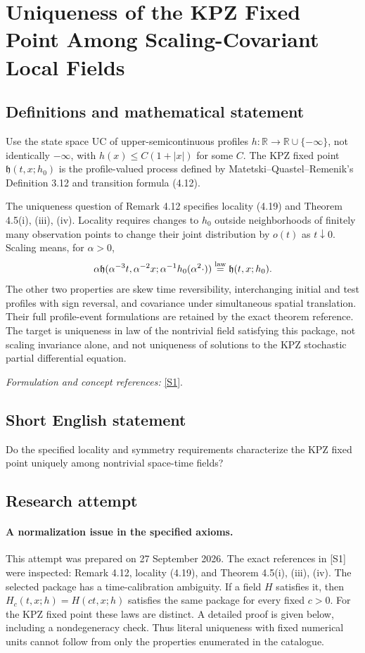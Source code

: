 \documentclass[11pt]{article}
\begin{document}
\section*{\texorpdfstring{Uniqueness of the KPZ Fixed Point Among Scaling-Covariant Local Fields}{Uniqueness of the KPZ Fixed Point Among Scaling-Covariant Local Fields}}\label{452}
\subsection{Definitions and mathematical statement}
Use the state space $\mathrm{UC}$ of upper-semicontinuous profiles $h:{\mathbb{R}}\to{\mathbb{R}}\cup\{-\infty\}$, not identically $-\infty$, with $h(x)\le C(1+|x|)$ for some $C$. The KPZ fixed point $\mathfrak h(t,x;h_0)$ is the profile-valued process defined by Matetski--Quastel--Remenik's Definition 3.12 and transition formula (4.12).

The uniqueness question of Remark 4.12 specifies locality (4.19) and Theorem 4.5(i), (iii), (iv). Locality requires changes to $h_0$ outside neighborhoods of finitely many observation points to change their joint distribution by $o(t)$ as $t\downarrow0$. Scaling means, for $\alpha>0$,
\[
 \alpha\mathfrak h(\alpha^{-3}t,\alpha^{-2}x;
       \alpha^{-1}h_0(\alpha^2\cdot))
 \overset{\rm law}=\mathfrak h(t,x;h_0).
\]
The other two properties are skew time reversibility, interchanging initial and test profiles with sign reversal, and covariance under simultaneous spatial translation. Their full profile-event formulations are retained by the exact theorem reference. The target is uniqueness in law of the nontrivial field satisfying this package, not scaling invariance alone, and not uniqueness of solutions to the KPZ stochastic partial differential equation.
\par\smallskip\textit{Formulation and concept references:} \href{https://arxiv.org/html/1701.00018v3}{[S1]}.

\subsection{Short English statement}
Do the specified locality and symmetry requirements characterize the KPZ fixed point uniquely among nontrivial space-time fields?
\subsection{Research attempt}
\paragraph{A normalization issue in the specified axioms.}
This attempt was prepared on 27 September 2026. The exact references in
[S1] were inspected: Remark 4.12, locality (4.19), and Theorem 4.5(i),
(iii), (iv). The selected package has a time-calibration ambiguity.
If a field $H$ satisfies it, then $H_c(t,x;h)=H(ct,x;h)$ satisfies the
same package for every fixed $c>0$. For the KPZ fixed point these laws
are distinct. A detailed proof is given below, including a nondegeneracy
check. Thus literal uniqueness with fixed numerical units cannot follow
from only the properties enumerated in the catalogue.
\end{document}
